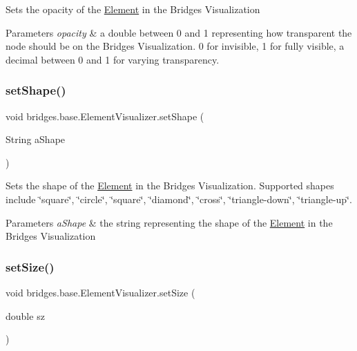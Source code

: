 Sets the opacity of the \hyperlink{classbridges_1_1base_1_1_element}{Element} in the Bridges Visualization


\begin{DoxyParams}{Parameters}
{\em opacity} & a double between 0 and 1 representing how transparent the node should be on the Bridges Visualization. 0 for invisible, 1 for fully visible, a decimal between 0 and 1 for varying transparency. \\
\hline
\end{DoxyParams}
\hypertarget{classbridges_1_1base_1_1_element_visualizer_ac3bad991904c8ad23e5233b341381d93}{}\label{classbridges_1_1base_1_1_element_visualizer_ac3bad991904c8ad23e5233b341381d93} 
\subsubsection{\texorpdfstring{set\+Shape()}{setShape()}}
{\footnotesize\ttfamily void bridges.\+base.\+Element\+Visualizer.\+set\+Shape (\begin{DoxyParamCaption}\item[{String}]{a\+Shape }\end{DoxyParamCaption})}

Sets the shape of the \hyperlink{classbridges_1_1base_1_1_element}{Element} in the Bridges Visualization. Supported shapes include \char`\"{}square\char`\"{}, \char`\"{}circle\char`\"{}, \char`\"{}square\char`\"{}, \char`\"{}diamond\char`\"{}, \char`\"{}cross\char`\"{}, \char`\"{}triangle-\/down\char`\"{}, \char`\"{}triangle-\/up\char`\"{}.


\begin{DoxyParams}{Parameters}
{\em a\+Shape} & the string representing the shape of the \hyperlink{classbridges_1_1base_1_1_element}{Element} in the Bridges Visualization \\
\hline
\end{DoxyParams}
\hypertarget{classbridges_1_1base_1_1_element_visualizer_aba410184f7df495594fc1fa7948335a5}{}\label{classbridges_1_1base_1_1_element_visualizer_aba410184f7df495594fc1fa7948335a5} 
\subsubsection{\texorpdfstring{set\+Size()}{setSize()}}
{\footnotesize\ttfamily void bridges.\+base.\+Element\+Visualizer.\+set\+Size (\begin{DoxyParamCaption}\item[{double}]{sz }\end{DoxyParamCaption})}

